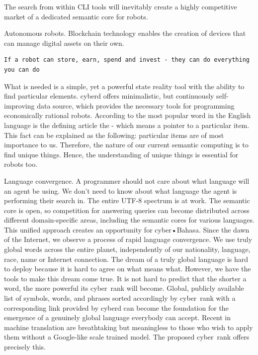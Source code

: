 \documentclass[8pt,oneside]{amsart}
\newcommand{\linkgreen}[2]{\href{#1}{\color{green}{#2}}}
\newcommand{\code}[1]{{\PlayBold #1}}
\begin{document}
The search from within CLI tools will inevitably create a highly competitive market of a dedicated semantic core for robots.

\code{Autonomous robots}. Blockchain technology enables the creation of devices that can manage digital assets on their own.

\begin{lstlisting}
If a robot can store, earn, spend and invest - they can do everything you can do
\end{lstlisting}

What is needed is a simple, yet a powerful state reality tool with the ability to find particular elements. \code{cyberd} offers minimalistic, but continuously self-improving data source, which provides the necessary tools for programming economically rational robots. According to \linkgreen{https://github.com/first20hours/google-10000-english}{top-10,000 English words} the most popular word in the English language is the defining article \code{the} - which means a pointer to a particular item. This fact can be explained as the following: particular items are of most importance to us. Therefore, the nature of our current semantic computing is to find unique things. Hence, the understanding of unique things is essential for robots too.

\code{Language convergence}. A programmer should not care about what language will an agent be using. We don't need to know about what language the agent is performing their search in. The entire UTF-8 spectrum is at work. The semantic core is open, so competition for answering queries can become distributed across different domain-specific areas, including the semantic cores for various languages. This unified approach creates an opportunity for cyber•Bahasa. Since the dawn of the Internet, we observe a process of rapid language convergence. We use truly global words across the entire planet, independently of our nationality, language, race, name or Internet connection. The dream of a truly global language is hard to deploy because it is hard to agree on what means what. However, we have the tools to make this dream come true. It is not hard to predict that the shorter a word, the more powerful its cyber~rank will become. Global, publicly available list of symbols, words, and phrases sorted accordingly by cyber~rank with a corresponding link provided by cyberd can become the foundation for the emergence of a genuinely global language everybody can accept. Recent \linkgreen{https://ipfs.io/ipfs/QmQUWBhDMfPKgFt3NfbxM1VU22oU8CRepUzGPBDtopwap1}{scientific advances} in machine translation are breathtaking but meaningless to those who wish to apply them without a Google-like scale trained model. The proposed cyber~rank offers precisely this.
\end{document}
